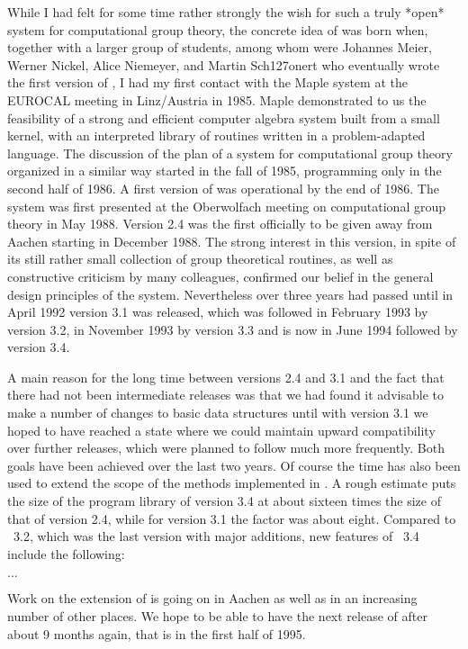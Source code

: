 While I had felt for some time rather strongly  the wish for such a truly
*open* system for computational group theory, the concrete idea of {\GAP}
was born when, together with a larger group of  students, among whom were
Johannes   Meier,    Werner   Nickel,   Alice     Niemeyer,   and  Martin
Sch\accent127onert who eventually wrote the first  version of {\GAP}, I
had my first contact   with the Maple system   at the EUROCAL  meeting in
Linz/Austria  in  1985.  Maple demonstrated   to us the feasibility  of a
strong  and efficient computer algebra system  built from a small kernel,
with an  interpreted library of   routines written in  a  problem-adapted
language.  The discussion of the plan of a system for computational group
theory organized  in    a similar  way  started  in  the  fall  of  1985,
programming only in the second half  of 1986.  A  first version of {\GAP}
was operational by  the end of 1986.  The  system was first  presented at
the Oberwolfach meeting    on computational group   theory  in May  1988.
Version  2.4  was  the first  officially  to  be  given  away from Aachen
starting in December 1988.  The strong interest in this version, in spite
of its  still rather small  collection of group theoretical  routines, as
well  as constructive criticism  by many colleagues, confirmed our belief
in the general design principles of the  system.  Nevertheless over three
years had passed until in April 1992  version 3.1 was released, which was
followed in February 1993 by version 3.2, in November 1993 by version 3.3
and is now in June 1994 followed by version 3.4.

A main reason for the long time between versions 2.4 and 3.1 and the fact
that there had not been  intermediate releases was that  we had found  it
advisable to make a number of changes to basic data structures until with
version 3.1 we  hoped  to have reached a   state where we could  maintain
upward compatibility over further  releases, which were planned to follow
much more frequently.  Both  goals have been  achieved over the last  two
years. Of course the time has  also been used to extend  the scope of the
methods implemented in {\GAP}.   A rough estimate   puts the size  of the
program library of version 3.4 at about sixteen times the size of that of
version 2.4, while for version 3.1 the factor  was about eight.  Compared
to {\GAP}~3.2,  which  was the  last version  with  major  additions, new
features of {\GAP}~3.4 include the following:

$\ldots$

Work on the  extension of {\GAP}  is going on in Aachen  as well as in an
increasing number of  other places. We  hope to be  able to have the next
release of {\GAP} after about  9 months again,  that is in the first half
of 1995.

